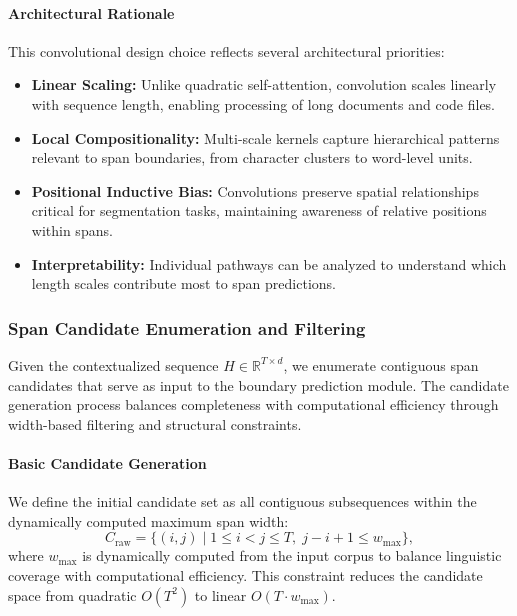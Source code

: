 \paragraph{Architectural Rationale}

This convolutional design choice reflects several architectural priorities:

\begin{itemize}
	\item \textbf{Linear Scaling:} Unlike quadratic self-attention, convolution scales linearly with sequence length, enabling processing of long documents and code files.
	\item \textbf{Local Compositionality:} Multi-scale kernels capture hierarchical patterns relevant to span boundaries, from character clusters to word-level units.
	\item \textbf{Positional Inductive Bias:} Convolutions preserve spatial relationships critical for segmentation tasks, maintaining awareness of relative positions within spans.
	\item \textbf{Interpretability:} Individual pathways can be analyzed to understand which length scales contribute most to span predictions.
\end{itemize}

\subsubsection{Span Candidate Enumeration and Filtering}
\label{sec:span-candidates}

Given the contextualized sequence \(H \in \mathbb{R}^{T \times d}\), we enumerate contiguous span candidates that serve as input to the boundary prediction module. The candidate generation process balances completeness with computational efficiency through width-based filtering and structural constraints.

\paragraph{Basic Candidate Generation}

We define the initial candidate set as all contiguous subsequences within the dynamically computed maximum span width:
\begin{equation}
C_{\text{raw}} = \{(i,j) \mid 1 \leq i < j \leq T, \; j - i + 1 \leq w_{\max}\},
\label{eq:raw-candidates}
\end{equation}
where \(w_{\max}\) is dynamically computed from the input corpus to balance linguistic coverage with computational efficiency. This constraint reduces the candidate space from quadratic \(O(T^2)\) to linear \(O(T \cdot w_{\max})\).


